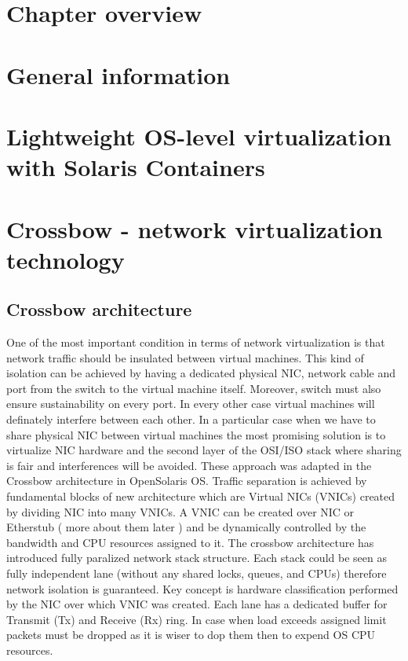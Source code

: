 \documentclass[11pt]{book}
\begin{document}
    \section*{Chapter overview}

    \section{General information}

    \section{Lightweight OS-level virtualization with Solaris Containers}

    \section{Crossbow - network virtualization technology}
	
		\subsection{Crossbow architecture}

        One of the most important condition in terms of network virtualization is that network traffic should be insulated between virtual machines.
        This kind of isolation can be achieved by having a dedicated physical NIC, network cable and port from the switch to the virtual machine itself. 
        Moreover, switch must also ensure sustainability on every port. In every other case virtual machines will definately interfere between each other.
        In a particular case when we have to share physical NIC between virtual machines the most promising solution is to virtualize NIC hardware and the
         second layer of the OSI/ISO stack where sharing is fair and interferences will be avoided. These approach was adapted in the Crossbow architecture
         in OpenSolaris OS.
        Traffic separation is achieved by fundamental blocks of new architecture which are Virtual NICs (VNICs) created by dividing NIC into many VNICs. 
        A VNIC can be created over NIC or Etherstub ( more about them later ) and be dynamically controlled by the bandwidth and CPU resources assigned to
        it.
        The crossbow architecture has introduced fully paralized network stack structure. Each stack could be seen as fully independent lane (without
        any shared locks, queues, and CPUs) therefore network isolation is guaranteed. Key concept is hardware classification performed by the NIC over 
        which VNIC was created. Each lane has a dedicated buffer for Transmit (Tx) and Receive (Rx) ring. In case when load exceeds assigned limit packets
         must be dropped as it is wiser to dop them then to expend OS CPU resources. 
\end{document}
